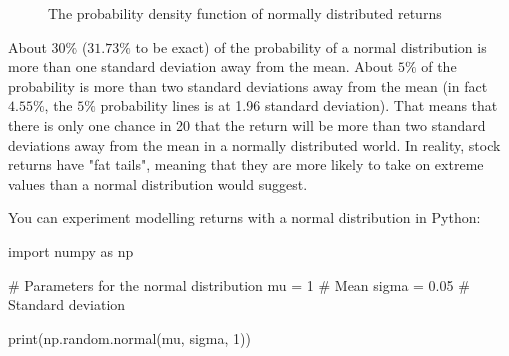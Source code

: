 \begin{figure}[!htbp]
    \centering
    \caption{The probability density function of normally distributed returns}
\end{figure}

About $30\%$ ($31.73\%$ to be exact) of the probability 
of a normal distribution is more than one standard deviation
away from the mean. About $5\%$ of the probability is more
than two standard deviations away from the mean (in fact 
$4.55\%$, the $5\%$ probability lines is at 1.96 standard deviation).
That means that there is only one chance in 20 that the return
will be more than two standard deviations away from the mean 
in a normally distributed world. In reality, stock returns 
have "fat tails", meaning that they are more likely to take 
on extreme values than a normal distribution would suggest.

You can experiment modelling returns with
a normal distribution in Python:

\begin{python}
import numpy as np

# Parameters for the normal distribution
mu = 1  # Mean
sigma = 0.05  # Standard deviation

print(np.random.normal(mu, sigma, 1))
\end{python}

